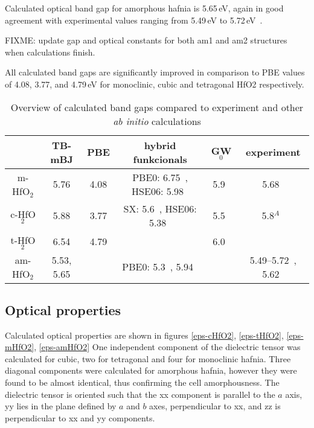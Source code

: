 \documentclass[10pt,a4paper,twocolumn]{article}
\begin{document}
Calculated optical band gap for amorphous hafnia is 5.65\,eV, again in good agreement with experimental values ranging from 5.49\,eV to 5.72\,eV~\cite{Takeuchi2004, Nguyen2005}.

FIXME: update gap and optical constants for both am1 and am2 structures when calculations finish.

All calculated band gaps are significantly improved in comparison to PBE values of 4.08, 3.77, and 4.79\,eV for monoclinic, cubic and tetragonal HfO2 respectively.
 

\begin{table*}
\begin{center}

\begin{tabular}{c|ccccc}
			& TB-mBJ & PBE & hybrid funkcionals & GW$_0$ & experiment \\
\hline
m-HfO$_2$ &	5.76 & 4.08 & PBE0: 6.75~\cite{Komsa2010}, HSE06: 5.98~\cite{Komsa2010} & 5.9~\cite{Gruning2010} & 5.68~\cite{Balog1977} \\
c-HfO$_2$ &	5.88 & 3.77 & SX: 5.6~\cite{Clark2010}, HSE06: 5.38~\cite{Yang2014} & 5.5~\cite{Gruning2010} & 5.8$^A$~\cite{Lim2002}\\
t-HfO$_2$ &	6.54 & 4.79 &  & 6.0~\cite{Gruning2010} & \\
am-HfO$_2$ & 5.53, 5.65 & & PBE0: 5.3~\cite{Broqvist2007}, 5.94~\cite{Chen2011} &  & 5.49--5.72~\cite{Takeuchi2004}, 5.62~\cite{Nguyen2005}\\

\end{tabular}
\caption{Overview of calculated band gaps compared to experiment and other \textit{ab initio} calculations}
\label{gaps}
\end{center}
\end{table*}

\subsection{Optical properties}

Calculated optical properties are shown in figures \ref{eps-cHfO2}, \ref{eps-tHfO2}, \ref{eps-mHfO2}, \ref{eps-amHfO2} 
One independent component of the dielectric tensor was calculated for cubic, two for tetragonal and four for monoclinic hafnia.
Three diagonal components were calculated for amorphous hafnia, however they were found to be almost identical, thus confirming the cell amorphousness.
The dielectric tensor is oriented such that the xx component is parallel to the $a$ axis, yy lies in the plane defined by $a$ and $b$ axes, perpendicular to xx, and zz is perpendicular to xx and yy components.
\end{document}
